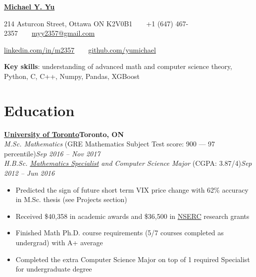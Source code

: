 \documentclass[10pt,letterpaper]{article}
\newcommand*\company[1]{\textbf{#1}}
\newcommand*\position[1]{\textit{#1}}
\newcommand*\location\company
\newcommand*\timespan\position
\begin{document}
\pagestyle{empty}
\begin{center}
{\huge\textbf{\href{https://github.com/yumichael/resume-v5}{Michael Y. Yu}}}

214 Asturcon Street, Ottawa ON K2V0B1\ \ \textbullet\ \ +1 (647) 467-2357\ \ \textbullet\ \ \href{mailto:myy2357@gmail.com}{myy2357@gmail.com}

\href{https://www.linkedin.com/in/m2357/}{linkedin.com/in/m2357}\ \ \textbullet\ \ \href{https://github.com/yumichael}{github.com/yumichael}
\end{center}
\textbf{Key skills}: understanding of advanced math and computer science theory, Python, C, C++, Numpy, Pandas, XGBoost

\section*{Education}
\company{\href{https://www.utoronto.ca/}{University of Toronto}}\hfill\location{Toronto, ON}\\
\position{M.Sc. Mathematics} (GRE Mathematics Subject Test score: 900 --- 97 percentile)\hfill\timespan{Sep 2016 -- Nov 2017}
\\
\position{H.B.Sc. \href{http://calendar.artsci.utoronto.ca/crs_mat.htm\#ASSPE1165}{Mathematics Specialist} and Computer Science Major} (CGPA: 3.87/4)\hfill\timespan{Sep 2012 -- Jun 2016}
\begin{itemize}
\item Predicted the sign of future short term VIX price change with 62\% accuracy in M.Sc. thesis (see Projects section)
\item Received \$40,358 in academic awards and \$36,500 in \href{http://www.nserc-crsng.gc.ca/index_eng.asp}{NSERC} research grants
\item Finished Math Ph.D. course requirements (5/7 courses completed as undergrad) with A+ average
\item Completed the extra Computer Science Major on top of 1 required Specialist for undergraduate degree
\end{itemize}
\end{document}
